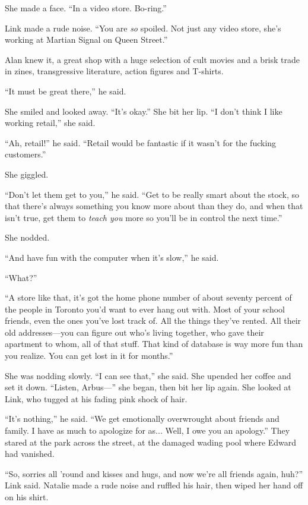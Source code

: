 She made a face.  ``In a video store.  Bo-ring.''

Link made a rude noise.  ``You are \textit{so} spoiled.  Not just any
video store, she's working at Martian Signal on Queen Street.''

Alan knew it, a great shop with a huge selection of cult movies and a
brisk trade in zines, transgressive literature, action figures and
T-shirts.

``It must be great there,'' he said.

She smiled and looked away.  ``It's okay.'' She bit her lip.  ``I
don't think I like working retail,'' she said.

``Ah, retail!'' he said.  ``Retail would be fantastic if it wasn't for
the fucking customers.''

She giggled.

``Don't let them get to you,'' he said.  ``Get to be really smart
about the stock, so that there's always something you know more about
than they do, and when that isn't true, get them to \textit{teach you}
more so you'll be in control the next time.''

She nodded.

``And have fun with the computer when it's slow,'' he said.

``What?''

``A store like that, it's got the home phone number of about seventy
percent of the people in Toronto you'd want to ever hang out with. 
Most of your school friends, even the ones you've lost track of.  All
the things they've rented.  All their old addresses---you can figure
out who's living together, who gave their apartment to whom, all of
that stuff.  That kind of database is way more fun than you realize. 
You can get lost in it for months.''

She was nodding slowly.  ``I can see that,'' she said.  She upended
her coffee and set it down.  ``Listen, Arbus---'' she began, then bit
her lip again.  She looked at Link, who tugged at his fading pink
shock of hair.

``It's nothing,'' he said.  ``We get emotionally overwrought about
friends and family.  I have as much to apologize for as...  Well, I
owe you an apology.'' They stared at the park across the street, at
the damaged wading pool where Edward had vanished.

``So, sorries all 'round and kisses and hugs, and now we're all
friends again, huh?'' Link said.  Natalie made a rude noise and
ruffled his hair, then wiped her hand off on his shirt.

